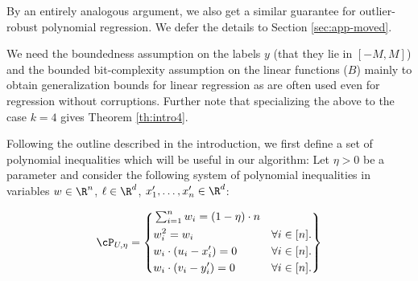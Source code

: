 By an entirely analogous argument, we also get a similar guarantee for outlier-robust polynomial regression. We defer the details to Section \ref{sec:app-moved}.


We need the boundedness assumption on the labels $y$ (that they lie in $[-M,M]$) and the bounded bit-complexity assumption on the linear functions ($B$) mainly to obtain generalization bounds for linear regression as are often used even for regression without corruptions. Further note that specializing the above to the case $k=4$ gives Theorem \ref{th:intro4}. 

Following the outline described in the introduction, we first define a set of polynomial inequalities which will be useful in our algorithm: Let $\eta > 0$ be a parameter and consider the following system of polynomial inequalities in variables $w \in \R^n$, $\ell \in \R^d$, $x'_1,\ldots,x'_n \in \R^d$: 

\begin{equation}
  \cP_{U,\eta} = 
  \left \{
    \begin{aligned}
      & \textstyle\sum_{i=1}^n w_i
      = (1-\eta) \cdot n & &\\
      & w_i^2
      =w_i 
      &\forall i\in [n]. &\\
      & w_i \cdot (u_i - x'_i)
       = 0
      &\forall i\in [n]. &\\
      & w_i \cdot (v_i - y'_i)
      = 0
      &\forall i\in [n]. &%
    \end{aligned}
  \right \} \label{eq:polynomial-constraints-w}
\end{equation}












